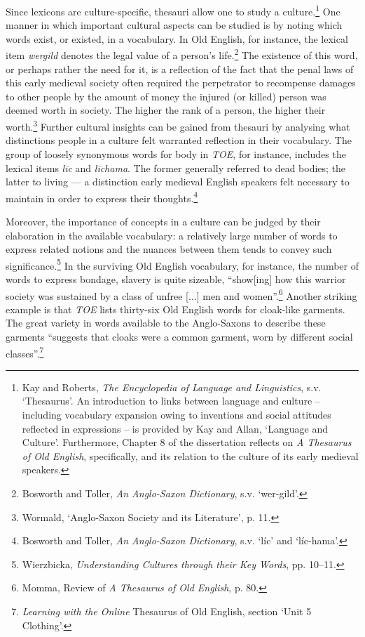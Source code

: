 Since lexicons are culture-specific, thesauri allow one to study a culture.\footnote{Kay and Roberts, \textit{The Encyclopedia of Language and Linguistics}, s.v. `Thesaurus'. An introduction to links between language and culture -- including vocabulary expansion owing to inventions and social attitudes reflected in expressions -- is provided by Kay and Allan, `Language and Culture'. Furthermore, Chapter 8 of the dissertation reflects on \textit{A Thesaurus of Old English}, specifically, and its relation to the culture of its early medieval speakers.} One manner in which important cultural aspects can be studied is by noting which words exist, or existed, in a vocabulary. In Old English, for instance, the lexical item \textit{wergild} denotes the legal value of a person's life.\footnote{Bosworth and Toller, \textit{An Anglo-Saxon Dictionary}, s.v. `wer-gild'.} The existence of this word, or perhaps rather the need for it, is a reflection of the fact that the penal laws of this early medieval society often required the perpetrator to recompense damages to other people by the amount of money the injured (or killed) person was deemed worth in society. The higher the rank of a person, the higher their worth.\footnote{Wormald, `Anglo-Saxon Society and its Literature', p. 11.} Further cultural insights can be gained from thesauri by analysing what distinctions people in a culture felt warranted reflection in their vocabulary. The group of loosely synonymous words for body in \textit{TOE}, for instance, includes the lexical items \textit{līc} and \textit{līchama}. The former generally referred to dead bodies; the latter to living --- a distinction early medieval English speakers felt necessary to maintain in order to express their thoughts.\footnote{Bosworth and Toller, \textit{An Anglo-Saxon Dictionary}, s.v. `líc' and `líc-hama'.}

Moreover, the importance of concepts in a culture can be judged by their elaboration in the available vocabulary: a relatively large number of words to express related notions and the nuances between them tends to convey such significance.\footnote{Wierzbicka, \textit{Understanding Cultures through their Key Words}, pp. 10–11.} In the surviving Old English vocabulary, for instance, the number of words to express bondage, slavery is quite sizeable, ``show[ing] how this warrior society was sustained by a class of unfree [...] men and women''.\footnote{Momma, Review of \textit{A Thesaurus of Old English}, p. 80.} Another striking example is that \textit{TOE} lists thirty-six Old English words for cloak-like garments. The great variety in words available to the Anglo-Saxons to describe these garments ``suggests that cloaks were a common garment, worn by different social classes''.\footnote{\textit{Learning with the Online} Thesaurus of Old English, section `Unit 5 Clothing'.}


